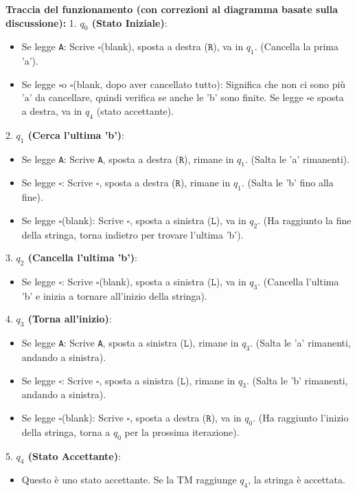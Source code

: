 \documentclass[a4paper]{article}
\theoremstyle{definition} %
\newcommand{\blankS}{\ensuremath{\square}}
\begin{document}
\textbf{Traccia del funzionamento (con correzioni al diagramma basate sulla discussione):}
1.  \textbf{$q_0$ (Stato Iniziale)}:
    \begin{itemize}
        \item Se legge \texttt{A}: Scrive \blankS (blank), sposta a destra ($\texttt{R}$), va in $q_1$. (Cancella la prima 'a').
        \item Se legge \blankS o \blankS (blank, dopo aver cancellato tutto): Significa che non ci sono più 'a' da cancellare, quindi verifica se anche le 'b' sono finite. Se legge \blankS e sposta a destra, va in $q_4$ (stato accettante).
    \end{itemize}
2.  \textbf{$q_1$ (Cerca l'ultima 'b')}:
    \begin{itemize}
        \item Se legge \texttt{A}: Scrive \texttt{A}, sposta a destra ($\texttt{R}$), rimane in $q_1$. (Salta le 'a' rimanenti).
        \item Se legge \blankS: Scrive \blankS, sposta a destra ($\texttt{R}$), rimane in $q_1$. (Salta le 'b' fino alla fine).
        \item Se legge \blankS (blank): Scrive \blankS, sposta a sinistra ($\texttt{L}$), va in $q_2$. (Ha raggiunto la fine della stringa, torna indietro per trovare l'ultima 'b').
    \end{itemize}
3.  \textbf{$q_2$ (Cancella l'ultima 'b')}:
    \begin{itemize}
        \item Se legge \blankS: Scrive \blankS (blank), sposta a sinistra ($\texttt{L}$), va in $q_3$. (Cancella l'ultima 'b' e inizia a tornare all'inizio della stringa).
    \end{itemize}
4.  \textbf{$q_3$ (Torna all'inizio)}:
    \begin{itemize}
        \item Se legge \texttt{A}: Scrive \texttt{A}, sposta a sinistra ($\texttt{L}$), rimane in $q_3$. (Salta le 'a' rimanenti, andando a sinistra).
        \item Se legge \blankS: Scrive \blankS, sposta a sinistra ($\texttt{L}$), rimane in $q_3$. (Salta le 'b' rimanenti, andando a sinistra).
        \item Se legge \blankS (blank): Scrive \blankS, sposta a destra ($\texttt{R}$), va in $q_0$. (Ha raggiunto l'inizio della stringa, torna a $q_0$ per la prossima iterazione).
    \end{itemize}
5.  \textbf{$q_4$ (Stato Accettante)}:
    \begin{itemize}
        \item Questo è uno stato accettante. Se la TM raggiunge $q_4$, la stringa è accettata.
    \end{itemize}
\end{document}
